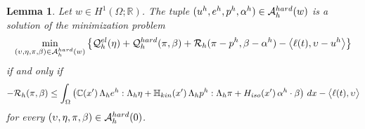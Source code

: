 \documentclass[10pt,a4paper]{amsart}
\newtheorem{lemma}{Lemma}
\newcommand{\C}{\mathbb{C}}
\newcommand{\Hiso}{H_{\rm iso}}
\newcommand{\Hkin}{\mathbb{H}_{\rm kin}}
\newcommand{\R}{\mathbb{R}}
\newcommand{\calA}{\mathcal{A}}
\newcommand{\calQ}{\mathcal{Q}}
\newcommand{\calR}{\mathcal{R}}
\begin{document}
\begin{lemma} \label{stability condition equivalence}
Let $w \in H^1(\Omega;\R)$.
The tuple $(u^h, e^h, p^h, \alpha^h) \in \calA_{h}^{\rm hard}(w)$ is a solution of the minimization problem
\begin{equation} \label{minimum problem h}
	\min_{(\upsilon, \eta, \pi, \beta) \in \calA_{h}^{\rm hard}(w)}
	\left\{ 
	\calQ^{\rm el}_{h}(\eta) + \calQ^{\rm hard}_{h}(\pi, \beta) + \calR_{h}(\pi - p^h, \beta - \alpha^h) 
	- \big\langle \ell(t), \upsilon - u^h \big\rangle 
	\right\}
\end{equation}
if and only if
\begin{equation} \label{minimality condition h}
	- \calR_{h}(\pi, \beta) \leq 
	\int_{\Omega} \left( \C\!\left(x'\right) \Lambda_h e^h : \Lambda_h \eta + \Hkin\!\left(x'\right) \Lambda_h p^h : \Lambda_h \pi + \Hiso\!\left(x'\right) \alpha^h \cdot \beta \right) \,dx - \big\langle \ell(t), \upsilon \big\rangle
\end{equation}
for every $(\upsilon, \eta, \pi, \beta) \in \calA_{h}^{\rm hard}(0)$.
\end{lemma}
\end{document}
